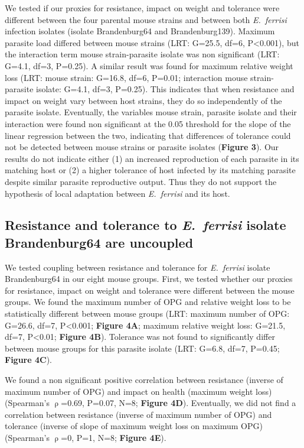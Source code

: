 \documentclass[12pt]{article}
\begin{document}
We tested if our proxies for resistance, impact on weight and tolerance were different between the four parental mouse strains and between both \textit{E.~ferrisi} infection isolates (isolate Brandenburg64 and Brandenburg139). Maximum parasite load differed between mouse strains (LRT: G=25.5, df=6, P<0.001), but the interaction term mouse strain-parasite isolate was non significant (LRT: G=4.1, df=3, P=0.25). A similar result was found for maximum relative weight loss (LRT: mouse strain: G=16.8, df=6, P=0.01; interaction mouse strain-parasite isolate: G=4.1, df=3, P=0.25). This indicates that when resistance and impact on weight vary between host strains, they do so independently of the parasite isolate. Eventually, the variables mouse strain, parasite isolate and their interaction were found non significant at the 0.05 threshold for the slope of the linear regression between the two, indicating that differences of tolerance could not be detected between mouse strains or parasite isolates (\textbf{Figure 3}). Our results do not indicate either (1) an increased reproduction of each parasite in its matching host or (2) a higher tolerance of host infected by its matching parasite despite similar parasite reproductive output. Thus they do not support the hypothesis of local adaptation between \textit{E.~ferrisi} and its host.

\subsection{Resistance and tolerance to \textit{E.~ferrisi }isolate Brandenburg64 are uncoupled}

We tested coupling between resistance and tolerance for \textit{E.~ferrisi} isolate Brandenburg64 in our eight mouse groups. First, we tested whether our proxies for resistance, impact on weight and tolerance were different between the mouse groups. We found the maximum number of OPG and relative weight loss to be statistically different between mouse groups (LRT: maximum number of OPG: G=26.6, df=7, P<0.001; \textbf{Figure 4A}; maximum relative weight loss: G=21.5, df=7, P<0.01; \textbf{Figure 4B}). Tolerance was not found to significantly differ between mouse groups for this parasite isolate (LRT: G=6.8, df=7, P=0.45; \textbf{Figure 4C}).\par

We found a non significant positive correlation between resistance (inverse of maximum number of OPG) and impact on health (maximum weight loss) (Spearman's $\uprho$=0.69, P=0.07, N=8; \textbf{Figure 4D}). Eventually, we did not find a correlation between resistance (inverse of maximum number of OPG) and tolerance (inverse of slope of maximum weight loss on maximum OPG) (Spearman's $\uprho$=0, P=1, N=8; \textbf{Figure 4E}). \par
\end{document}
